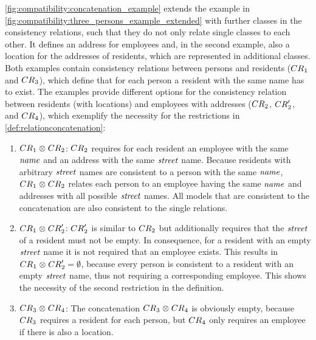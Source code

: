 \begin{example}
\autoref{fig:compatibility:concatenation_example} extends the example in \autoref{fig:compatibility:three_persons_example_extended} with further classes in the consistency relations, such that they do not only relate single classes to each other.
It defines an address for employees and, in the second example, also a location for the addresses of residents, which are represented in additional classes.
Both examples contain consistency relations between persons and residents ($\consistencyrelation{CR}{1}$ and $\consistencyrelation{CR}{3}$), which define that for each person a resident with the same name has to exist.
The examples provide different options for the consistency relation between residents (with locations) and employees with addresses ($\consistencyrelation{CR}{2}$, $\consistencyrelation{CR}{2}'$, and $\consistencyrelation{CR}{4}$), which exemplify the necessity for the restrictions in \autoref{def:relationconcatenation}:
\begin{enumerate}
    \item $\consistencyrelation{CR}{1} \concat \consistencyrelation{CR}{2}$: 
$\consistencyrelation{CR}{2}$ requires for each resident an employee with the same $\mathit{name}$ and an address with the same $\mathit{street}$ name.
Because residents with arbitrary $\mathit{street}$ names are consistent to a person with the same $\mathit{name}$, $\consistencyrelation{CR}{1} \concat \consistencyrelation{CR}{2}$ relates each person to an employee having the same $\mathit{name}$ and addresses with all possible $\mathit{street}$ names.
All models that are consistent to the concatenation are also consistent to the single relations.
    \item $\consistencyrelation{CR}{1} \concat \consistencyrelation{CR}{2}'$: 
$\consistencyrelation{CR}{2}'$ is similar to $\consistencyrelation{CR}{2}$ but additionally requires that the $\mathit{street}$ of a resident must not be empty. 
In consequence, for a resident with an empty $\mathit{street}$ name it is not required that an employee exists.
This results in $\consistencyrelation{CR}{1} \concat \consistencyrelation{CR}{2}' = \emptyset$, because every person is consistent to a resident with an empty $\mathit{street}$ name, thus not requiring a corresponding employee.
This shows the necessity of the second restriction in the definition. 
    \item $\consistencyrelation{CR}{3} \concat \consistencyrelation{CR}{4}$: 
The concatenation $\consistencyrelation{CR}{3} \concat \consistencyrelation{CR}{4}$ is obviously empty, because $\consistencyrelation{CR}{3}$ requires a resident for each person, but $\consistencyrelation{CR}{4}$ only requires an employee if there is also a location.

\end{enumerate}
\end{example}
